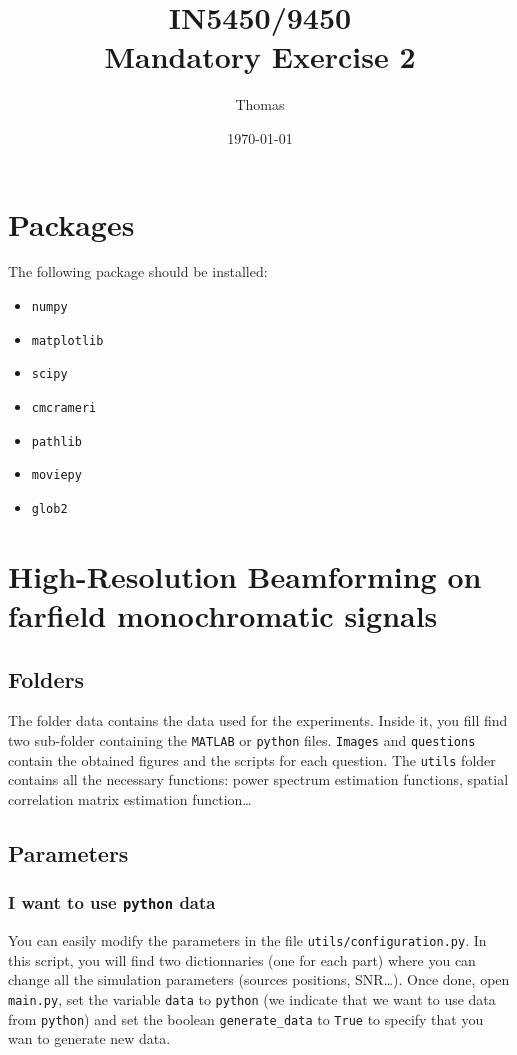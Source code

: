 \documentclass[8pt]{article}
\title{IN5450/9450\\ Mandatory Exercise 2}
\author{Thomas}
\date{\today}
\begin{document}
	\maketitle
\section{Packages}
The following package should be installed:
\begin{itemize}
	\item \texttt{numpy}
	\item \texttt{matplotlib}
	\item \texttt{scipy}
	\item \texttt{cmcrameri}
	\item \texttt{pathlib}
	\item \texttt{moviepy}
	\item \texttt{glob2}
\end{itemize}
\section{High-Resolution Beamforming on farfield monochromatic signals
}
\subsection{Folders}

The folder data contains the data used for the experiments. Inside it, you fill find two sub-folder containing the \texttt{MATLAB} or \texttt{python} files. \texttt{Images} and \texttt{questions} contain the obtained figures and the scripts for each question. The \texttt{utils} folder contains all the necessary functions: power spectrum estimation functions, spatial correlation matrix estimation function\dots
\subsection{Parameters}
\subsubsection{I want to use \texttt{python} data}
You can easily modify the parameters in the file \texttt{utils/configuration.py}. In this script, you will find two dictionnaries (one for each part) where you can change all the simulation parameters (sources positions, SNR\dots). Once done, open \texttt{main.py}, set the variable \texttt{data} to \texttt{python} (we indicate that we want to use data from \texttt{python}) and set the boolean \texttt{generate\_data} to \texttt{True} to specify that you wan to generate new data. 
\end{document}
